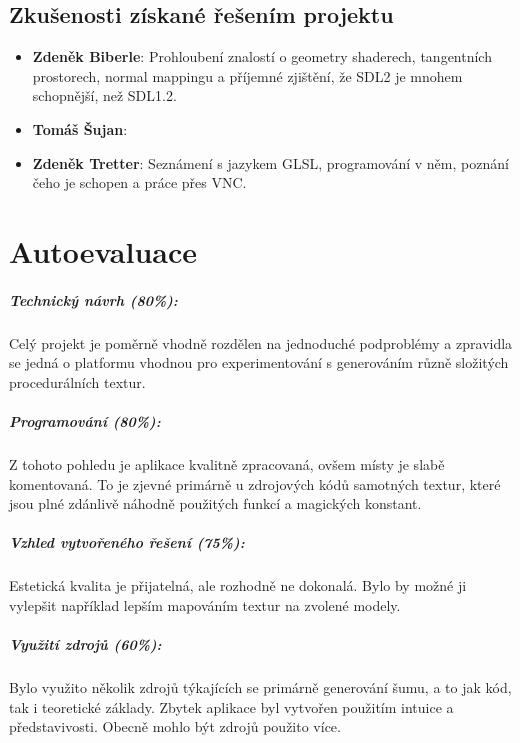 \documentclass[12pt,a4paper,titlepage,final]{report}
\newcommand\AuthorA{Zdeněk Biberle}
\newcommand\AuthorB{Tomáš Šujan}
\newcommand\AuthorC{Zdeněk Tretter}
\begin{document}
\section{Zkušenosti získané řešením projektu}

\begin{itemize}
\item \textbf{\AuthorA}: Prohloubení znalostí o geometry shaderech, tangentních prostorech, normal mappingu a příjemné zjištění, že SDL2 je mnohem schopnější, než SDL1.2.
\item \textbf{\AuthorB}:
\item \textbf{\AuthorC}: Seznámení s jazykem GLSL, programování v něm, poznání čeho je schopen a práce přes VNC.
\end{itemize}

\chapter{Autoevaluace}

\paragraph{Technický návrh (80\%):} Celý projekt je poměrně vhodně rozdělen na jednoduché podproblémy a zpravidla se jedná o platformu vhodnou pro experimentování s generováním různě složitých procedurálních textur.

\paragraph{Programování (80\%):} Z tohoto pohledu je aplikace kvalitně zpracovaná, ovšem místy je slabě komentovaná. To je zjevné primárně u zdrojových kódů samotných textur, které jsou plné zdánlivě náhodně použitých funkcí a magických konstant.

\paragraph{Vzhled vytvořeného řešení (75\%):} Estetická kvalita je přijatelná, ale rozhodně ne dokonalá. Bylo by možné ji vylepšit například lepším mapováním textur na zvolené modely.

\paragraph{Využití zdrojů (60\%):} Bylo využito několik zdrojů týkajících se primárně generování šumu, a to jak kód, tak i teoretické základy. Zbytek aplikace byl vytvořen použitím intuice a představivosti. Obecně mohlo být zdrojů použito více.
\end{document}

